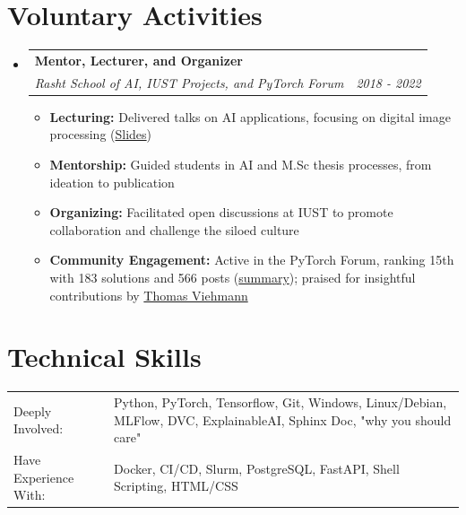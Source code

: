 \documentclass[letterpaper,11pt]{article}
\makeatletter
\newcommand{\resumeItem}[1]{
  \item\small{
    {#1 \vspace{0pt}}
  }
}
\newcommand{\resumeSubheading}[5]{
  \item
    \begin{tabular*}{0.97\textwidth}{l@{\extracolsep{\fill}}r}
      \textbf{#1} & #2 \\ 
      \textit{\small#3} & \textit{\small #4} \\
      \textit{#5} & 
    \end{tabular*}\vspace{-5pt}
}
\newcommand{\resumeSubheadingF}[4]{
  \item
    \begin{tabular*}{0.97\textwidth}{l@{\extracolsep{\fill}}r}
      \textbf{#1} & #2 \\ 
      \textit{\small#3} & \textit{\small #4} \\
    \end{tabular*}\vspace{-5pt}
}
\newcommand{\resumeSubHeadingListStart}{\begin{itemize}[leftmargin=*]}
\newcommand{\resumeSubHeadingListEnd}{\end{itemize}}
\newcommand{\resumeItemListStart}{\begin{itemize}}
\newcommand{\resumeItemListEnd}{\end{itemize}\vspace{-5pt}}
\makeatother
\begin{document}

\section{Voluntary Activities}
\resumeSubHeadingListStart
  \resumeSubheadingF
    {Mentor, Lecturer, and Organizer}{}
    {Rasht School of AI, IUST Projects, and PyTorch Forum}{2018 - 2022}
    \resumeItemListStart
      \resumeItem{\textbf{Lecturing:} Delivered talks on AI applications, focusing on digital image processing (\href{https://github.com/rasht-school-of-ai/Meetup-Materials}{Slides})}
      \resumeItem{\textbf{Mentorship:} Guided students in AI and M.Sc thesis processes, from ideation to publication}
      \resumeItem{\textbf{Organizing:} Facilitated open discussions at IUST to promote collaboration and challenge the siloed culture}
      \resumeItem{\textbf{Community Engagement:} Active in the PyTorch Forum, ranking 15th with 183 solutions and 566 posts (\href{https://discuss.pytorch.org/u/Nikronic/}{summary}); praised for insightful contributions by \href{https://twitter.com/ThomasViehmann/status/1309794697049714689}{Thomas Viehmann}}
    \resumeItemListEnd
\resumeSubHeadingListEnd

\section{Technical Skills}
  \begin{tabular}{>{\raggedright}p{4cm} @{\hskip 1cm} p{13cm}}
    Deeply Involved: & Python, PyTorch, Tensorflow, Git, Windows, Linux/Debian, MLFlow, DVC, ExplainableAI, Sphinx Doc, "why you should care" \\[0.6cm]
    Have Experience With: & Docker, CI/CD, Slurm, PostgreSQL, FastAPI, Shell Scripting, HTML/CSS
  \end{tabular}
\end{document}
